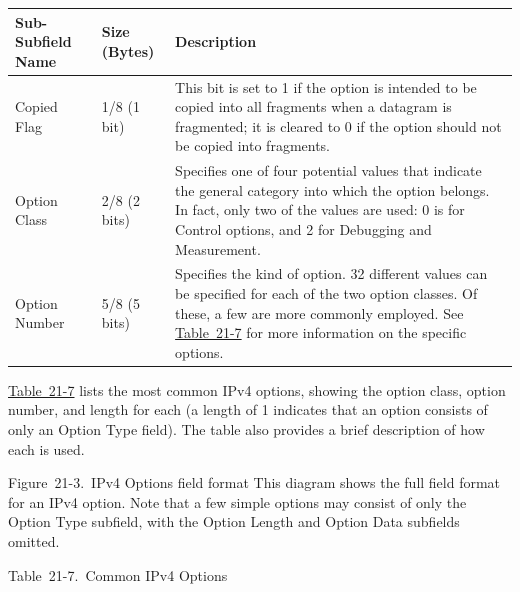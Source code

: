 \documentclass[b5paper,11pt]{memoir}
\begin{document}
\begin{longtable}[]{@{}lll@{}}
\toprule
Sub-Subfield Name & Size (Bytes) & Description\tabularnewline
\midrule
\endhead
Copied Flag & 1/8 (1 bit) & This bit is set to 1 if the option is
intended to be copied into all fragments when a datagram is fragmented;
it is cleared to 0 if the option should not be copied into
fragments.\tabularnewline
Option Class & 2/8 (2 bits) & Specifies one of four potential values
that indicate the general category into which the option belongs. In
fact, only two of the values are used: 0 is for Control options, and 2
for Debugging and Measurement.\tabularnewline
Option Number & 5/8 (5 bits) & Specifies the kind of option. 32
different values can be specified for each of the two option classes. Of
these, a few are more commonly employed. See
\protect\hyperlink{ch21s03.htmlux5cux23common_ipv_options}{Table~21-7}
for more information on the specific options.\tabularnewline
\bottomrule
\end{longtable}

\protect\hyperlink{ch21s03.htmlux5cux23common_ipv_options}{Table~21-7}
lists the most common IPv4 options, showing the option class, option
number, and length for each (a length of 1 indicates that an option
consists of only an Option Type field). The table also provides a brief
description of how each is used.

\protect\hypertarget{ch21s03.htmlux5cux23ipv4_options_field_format_this_diagram_s}{}{}

\protect\hypertarget{ch21s03.htmlux5cux23I_mediaobject7_d1e23498}{}{}

Figure~21-3.~IPv4 Options field format This diagram shows the full field
format for an IPv4 option. Note that a few simple options may consist of
only the Option Type subfield, with the Option Length and Option Data
subfields omitted.

\protect\hypertarget{ch21s03.htmlux5cux23common_ipv_options}{}{}

Table~21-7.~Common IPv4 Options
\end{document}
